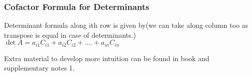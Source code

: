 \documentclass[]{article}
\begin{document}
\vspace{10pt}

\subsubsection{Cofactor Formula for Determinants}
\vspace{10pt}

Determinant formula along ith row is given by(we can take along column too as transpose is equal in case of determinants.)\\

\noindent
$\det{A} = a_{i1}C_{i1}+a_{i2}C_{i2}+....+a_{in}C_{in}$\\


\begin{mytheorem}[title=Extra material]
	Extra material to develop more intuition can be found in book and supplementary notes 1.
\end{mytheorem}

	
	
	
\end{document}
